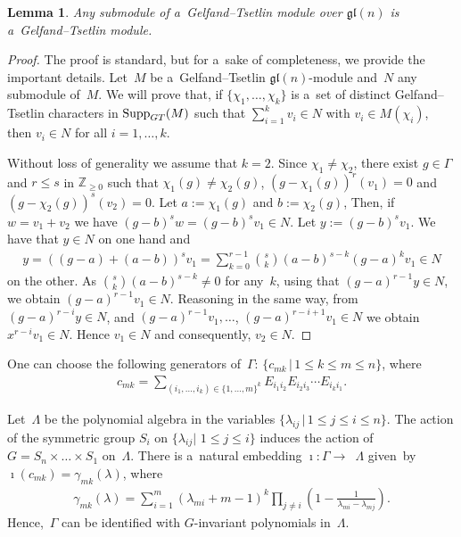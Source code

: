 \documentclass[11pt]{article}
\DeclareMathOperator\Supp{Supp} \DeclareMathOperator\codim{codim} \DeclareMathOperator\Y{Y}
\numberwithin{equation}{section}
\newtheorem{Lemma}[Theorem]{Lemma}
\begin{document}
\begin{Lemma}
\label{lemma elements of Gamma separates tableaux}
Any submodule of a~Gelfand--Tsetlin module over $\mathfrak{gl}(n)$ is a~Gelfand--Tsetlin mo\-dule.
\end{Lemma}

\begin{proof}
The proof is standard, but for a~sake of completeness, we provide the important details.
Let~$M$ be a~Gelfand--Tsetlin $\mathfrak{gl}(n)$-module and~$N$ any submodule of~$M$.
We will prove that, if $\{\chi_{1},\dots,\chi_{k} \}$ is a~set of distinct Gelfand--Tsetlin characters in
$\Supp_{\rm GT}(M)$ such that $\sum\limits_{i=1}^{k}v_{i}\in N$ with $v_{i}\in M(\chi_{i})$, then $v_{i}\in N$ for all
$i=1,\ldots,k$.

Without loss of generality we assume that $k=2$.
Since $\chi_{1}\neq\chi_{2}$, there exist $g\in\Gamma$ and $r\leq s$ in $\mathbb{Z}_{\geq 0}$ such that
$\chi_{1}(g)\neq\chi_{2}(g)$, $(g-\chi_{1}(g))^{r}(v_{1})=0$ and $(g-\chi_{2}(g))^{s}(v_{2})=0$.
Let $a:=\chi_{1}(g)$ and $b:= \chi_{2}(g)$, Then, if $w=v_{1}+v_{2}$ we have $(g-b)^{s}w=(g-b)^{s}v_{1}\in N$.
Let $y:= (g-b)^sv_1$.
We have that $y \in N$ on one hand and
\begin{gather*}
y=((g-a)+(a-b))^{s}v_{1}=\sum\limits_{k=0}^{r-1} {s\choose k}(a-b)^{s-k}(g-a)^{k}v_{1}\in N
\end{gather*}
on the other.
As ${s\choose k}(a-b)^{s-k}\neq 0$ for any~$k$, using that $(g-a)^{r-1}y\in N$, we obtain \mbox{$(g-a)^{r-1}v_1\in N$}.
Reasoning in the same way, from $(g-a)^{r-i}y\in N$, and $(g-a)^{r-1}v_{1},\ldots$, $(g-a)^{r-i+1}v_{1}\in N $ we obtain $
x^{r-i}v_{1}\in N$.
Hence $v_{1}\in N$ and consequently, $v_{2}\in N$.
\end{proof}

One can choose the following generators of~$\Gamma$: $\{c_{mk} \,|\, 1\leq k\leq m\leq n \}$, where
\begin{gather}
\label{equ_3}
c_{mk}= {\sum\limits_{(i_1,\ldots,i_k)\in \{1,\ldots,m \}^k}} E_{i_1 i_2}E_{i_2 i_3}\cdots E_{i_k i_1}.
\end{gather}

Let~$\Lambda$ be the polynomial algebra in the variables $\{\lambda_{ij}\, | \, 1\leqslant j\leqslant i\leqslant n \}$.
The action of the symmetric group $S_i$ on $\{\lambda_{ij} |$ $1\leqslant j\leqslant i\}$ induces the action of $G = S_n
\times\dots \times S_1$ on~$\Lambda$.
There is a~natural embedding $\imath:{{\Gamma}}{\longrightarrow}$~$\Lambda$ given~by
$\imath(c_{mk})=\gamma_{mk}(\lambda)$, where
\begin{gather}
\label{def-gamma}
\gamma_{mk}(\lambda)=\sum\limits_{i=1}^m (\lambda_{mi}+m-1)^k \prod\limits_{j\ne i} \left(1-\frac{1}{\lambda_{mi}-\lambda_{mj}} \right).
\end{gather}
Hence,~$\Gamma$ can be identif\/ied with $G$-invariant polynomials in~$\Lambda$.
\end{document}
